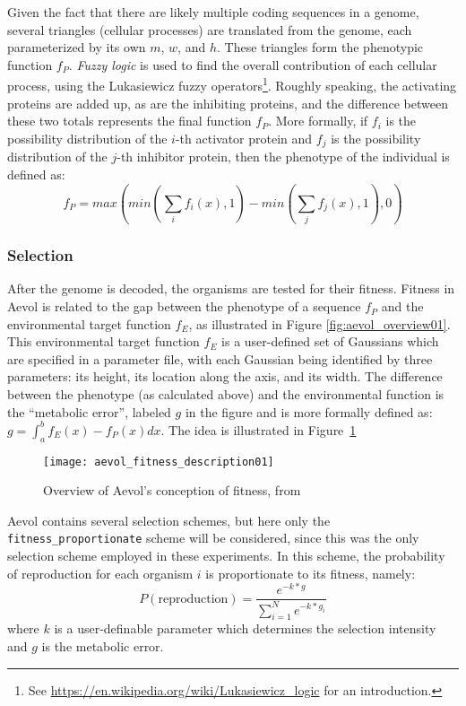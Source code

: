 Given the fact that there are likely multiple coding sequences in a genome, several triangles (cellular processes) are translated from the genome, each parameterized by its own $m$, $w$, and $h$. These triangles form the phenotypic function $f_P$. \textit{Fuzzy logic} is used to find the overall contribution of each cellular process, using the Lukasiewicz fuzzy operators\footnote{See \url{https://en.wikipedia.org/wiki/Lukasiewicz\_logic} for an introduction.}. Roughly speaking, the activating proteins are added up, as are the inhibiting proteins, and the difference between these two totals represents the final function $f_P$. More formally, if $f_i$ is the possibility distribution of the $i$-th activator protein and $f_j$ is the possibility distribution of the $j$-th inhibitor protein, then the phenotype of the individual is defined as:
\begin{equation*}
f_P = max\left(min\left(\sum_{i}^{}f_i(x),1 \right) - min\left(\sum_{j}^{}f_j(x),1 \right) ,0\right)
\end{equation*}

\subsubsection{Selection}\label{subsec:aevol_selection}
After the genome is decoded, the organisms are tested for their fitness. Fitness in Aevol is related to the gap between the phenotype of a sequence $f_P$ and the environmental  target function $f_E$, as illustrated in Figure \ref{fig:aevol_overview01}. This environmental target function $f_E$ is a user-defined set of Gaussians which are specified in a parameter file, with each Gaussian being identified by three parameters: its height, its location along the axis, and its width. The difference between the phenotype (as calculated above) and the environmental function is the ``metabolic error'', labeled $g$ in the figure and is more formally defined as:  $g = \int_{a}^{b} f_E(x) - f_P(x) dx$. The idea is illustrated in Figure~\ref{fig:aevol_fitness01}

\begin{figure}[h]
	\texttt{[image: aevol\_fitness\_description01]}
	\centering
	\caption[Overview of Aevol's concept of fitness.]{Overview of Aevol's conception of fitness, from \cite{knibbe:tel-00482375}}
	\label{fig:aevol_fitness01}
\end{figure}

Aevol contains several selection schemes, but here only the \texttt{fitness\_proportionate} scheme will be considered, since this was the only selection scheme employed in these experiments. In this scheme, the probability of reproduction for each organism $i$ is proportionate to its fitness, namely:
\begin{equation*}
P(\text{reproduction}) = \frac{e^{-k * g}}{\sum_{i=1}^{N} e^{-k * g_i}}
\end{equation*} 
where $k$ is a user-definable parameter which determines the selection intensity and $g$ is the metabolic error.

